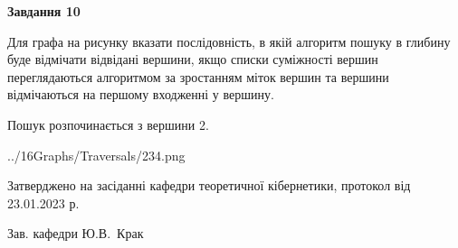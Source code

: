 \documentclass[12pt, ukrainian]{article}
\begin{document}
{\begin {large}
{\begin {center}\textbf{Завдання 10}\end {center}}\par
Для графа на рисунку вказати послідовність, в якій алгоритм пошуку в глибину буде відмічати відвідані вершини, якщо списки суміжності вершин переглядаються алгоритмом за зростанням міток вершин та вершини відмічаються на першому вход\-женні у вершину.\par
Пошук розпочинається з вершини 2.\par

\begin{center}
	{../16Graphs/Traversals/234.png}
\end{center}\par
\newpage


\end {large}
}
{\smallskip \begin {small} Затверджено на засіданні кафедри теоретичної кібернетики, протокол  від   23.01.2023 р.\par\smallskip\smallskip
{\parbox {6.5 cm}{Зав. кафедри \dotfill Ю.В.~Крак}} \end{small}}
\end{document}
